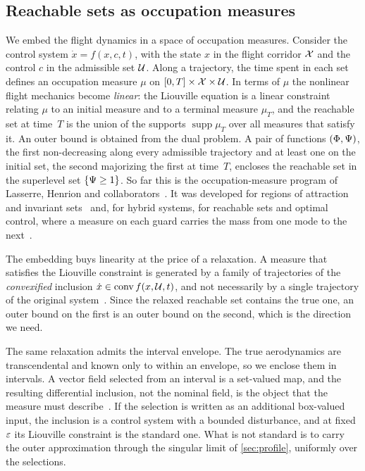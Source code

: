 \documentclass[english,11pt]{extarticle}
\begin{document}
\subsection{Reachable sets as occupation measures}\label{sec:embedding}
We embed the flight dynamics in a space of occupation measures. Consider
the control system $\dot x = f(x,c,t)$, with the state $x$ in the flight
corridor $\mathcal{X}$ and the control $c$ in the admissible set $\mathcal{U}$. Along a
trajectory, the time spent in each set defines an occupation measure $\mu$
on $[0,T]\times\mathcal{X}\times\mathcal{U}$. In terms of $\mu$ the nonlinear flight
mechanics become \emph{linear}: the Liouville equation is a linear
constraint relating $\mu$ to an initial measure and to a terminal measure
$\mu_T$, and the reachable set at time~$T$ is the union of the supports
$\operatorname{supp}\mu_T$ over all measures that satisfy it. An outer bound
is obtained from the dual problem. A pair of functions $(\Phi,\Psi)$, the
first non-decreasing along every admissible trajectory and at least one on
the initial set, the second majorizing the first at time~$T$, encloses the
reachable set in the superlevel set $\{\Psi\ge 1\}$. So far this is the
occupation-measure program of Lasserre, Henrion and
collaborators~\cite{lasserre2008nonlinear,vinter1993convex}. It was
developed for regions of attraction and invariant
sets~\cite{henrion2014convex,korda2014convex} and, for hybrid systems, for
reachable sets and optimal control, where a measure on each guard carries
the mass from one mode to the next~\cite{shia2014convex,zhao2020optimal}.

The embedding buys linearity at the price of a relaxation. A measure that
satisfies the Liouville constraint is generated by a family of trajectories
of the \emph{convexified} inclusion
$\dot x\in\operatorname{conv} f(x,\mathcal{U},t)$, and not necessarily by a single
trajectory of the original system~\cite[Lemma~3]{henrion2014convex}. Since
the relaxed reachable set contains the true one, an outer bound on the
first is an outer bound on the second, which is the direction we need.

The same relaxation admits the interval envelope. The true aerodynamics are
transcendental and known only to within an envelope, so we enclose them in
intervals. A vector field selected from an interval is a set-valued map, and
the resulting differential inclusion, not the nominal field, is the object
that the measure must
describe~\cite{filippov1988differential,aubin1984differential}. If the
selection is written as an additional box-valued input, the inclusion is a
control system with a bounded disturbance, and at fixed $\varepsilon$ its Liouville
constraint is the standard one. What is not standard is to carry the outer
approximation through the singular limit of \cref{sec:profile}, uniformly
over the selections.
\end{document}
